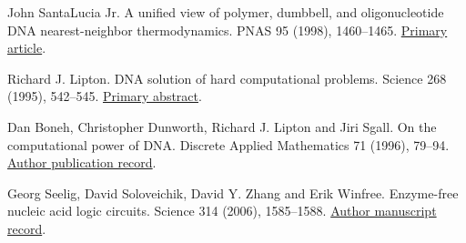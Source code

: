  John SantaLucia Jr. A unified view of polymer, dumbbell, and oligonucleotide DNA nearest-neighbor thermodynamics. PNAS 95 (1998), 1460--1465. \href{https://pmc.ncbi.nlm.nih.gov/articles/PMC19045/}{Primary article}.

 Richard J. Lipton. DNA solution of hard computational problems. Science 268 (1995), 542--545. \href{https://pubmed.ncbi.nlm.nih.gov/7725098/}{Primary abstract}.

 Dan Boneh, Christopher Dunworth, Richard J. Lipton and Jiri Sgall. On the computational power of DNA. Discrete Applied Mathematics 71 (1996), 79--94. \href{https://crypto.stanford.edu/~dabo/pubs/abstracts/biocircuit.html}{Author publication record}.

 Georg Seelig, David Soloveichik, David Y. Zhang and Erik Winfree. Enzyme-free nucleic acid logic circuits. Science 314 (2006), 1585--1588. \href{https://authors.library.caltech.edu/records/vf8a9-45s13}{Author manuscript record}.
